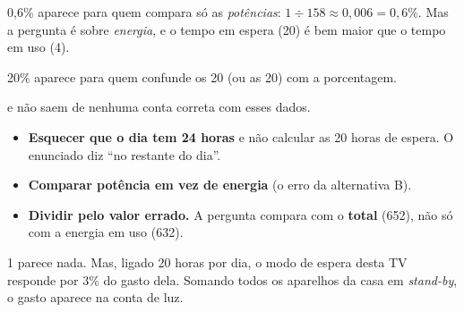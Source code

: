 
\begin{outras}
 0,6\% aparece para quem compara só as \emph{potências}: $1 \div 158 \approx 0{,}006 = 0{,}6\%$. Mas a pergunta é sobre \emph{energia}, e o tempo em espera (20) é bem maior que o tempo em uso (4).\par
{} 20\% aparece para quem confunde os 20 (ou as 20) com a porcentagem.\par
{} e  não saem de nenhuma conta correta com esses dados.
\end{outras}

\begin{pegadinha}
\begin{itemize}
  \item \textbf{Esquecer que o dia tem 24 horas} e não calcular as 20 horas de espera. O enunciado diz ``no restante do dia''.
  \item \textbf{Comparar potência em vez de energia} (o erro da alternativa B).
  \item \textbf{Dividir pelo valor errado.} A pergunta compara com o \textbf{total} (652), não só com a energia em uso (632).
\end{itemize}
\end{pegadinha}

\begin{guardar}
1 parece nada. Mas, ligado 20 horas por dia, o modo de espera desta TV responde por 3\% do gasto dela. Somando todos os
aparelhos da casa em \emph{stand-by}, o gasto aparece na conta de luz.
\end{guardar}
